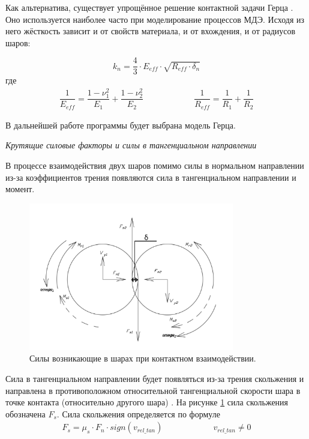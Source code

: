 \documentclass[utf8x, 14pt, oneside, a4paper]{article}
\begin{document}
Как альтернатива, существует упрощённое решение контактной задачи Герца \cite{friction_calibration}.
Оно используется наиболее часто при моделирование процессов МДЭ.
Исходя из него жёсткость зависит и от свойств материала, и от вхождения, и от радиусов шаров:

\begin{equation}
\label{kn_herz}
k_n = \frac{4}{3} \cdot E_{eff} \cdot \sqrt{R_{eff} \cdot \delta_n}
\end{equation}
где 
\begin{align}
\dfrac{1}{E_{eff}} = \dfrac{1 - \nu_1^2}{E_1} + \dfrac{1 - \nu_2^2}{E_2} \qquad \qquad \qquad \dfrac{1}{R_{eff}} = \dfrac{1}{R_1} + \dfrac{1}{R_2}
\end{align}


В дальнейшей работе программы будет выбрана модель Герца.


\textit{Крутящие силовые факторы и силы в тангенциальном направлении}
\label{angular_subsection}


В процессе взаимодействия двух шаров помимо силы в нормальном направлении из-за коэффициентов трения появляются сила в тангенциальном направлении и момент.

\begin{figure}[H]
	\centering
	\includegraphics[width=0.8\textwidth]{sily}
	\caption{Силы возникающие в шарах при контактном взаимодействии.}
	\label{pic:sily}
\end{figure} 

Сила в тангенциальном направлении будет появляться из-за трения скольжения и направлена в противоположном относительной тангенциальной скорости шара в точке контакта (относительно другого шара) \cite{friction_calibration}. На рисунке \ref{pic:sily} сила скольжения обозначена $F_s$. Сила скольжения определяется по формуле
\begin{align}
\label{sliding_force}
F_s = \mu_s \cdot F_n \cdot sign(v_{rel\_tan}) \qquad \qquad \qquad v_{rel\_tan} \neq 0
\end{align}
\end{document}
